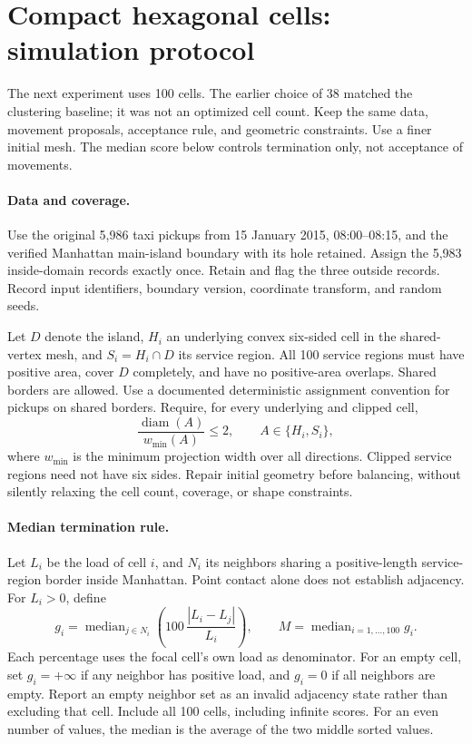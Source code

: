 \section{Compact hexagonal cells: simulation protocol}
\label{sec:compact-hexagon-protocol}

The next experiment uses 100 cells. The earlier choice of 38 matched
the clustering baseline; it was not an optimized cell count.
Keep the same data, movement proposals, acceptance rule, and geometric
constraints. Use a finer initial mesh. The median score below controls
termination only, not acceptance of movements.

\paragraph{Data and coverage.}
Use the original 5,986 taxi pickups from 15 January 2015,
08:00--08:15, and the verified Manhattan main-island boundary with
its hole retained. Assign the 5,983 inside-domain records exactly once.
Retain and flag the three outside records. Record input identifiers,
boundary version, coordinate transform, and random seeds.

Let $D$ denote the island, $H_i$ an underlying convex six-sided cell
in the shared-vertex mesh, and $S_i=H_i\cap D$ its service region.
All 100 service regions must have positive area, cover $D$ completely,
and have no positive-area overlaps. Shared borders are allowed.
Use a documented deterministic assignment convention for pickups on
shared borders. Require, for every underlying and clipped cell,
\[
 \frac{\operatorname{diam}(A)}{w_{\min}(A)}\leq 2,
 \qquad A\in\{H_i,S_i\},
\]
where $w_{\min}$ is the minimum projection width over all directions.
Clipped service regions need not have six sides.
Repair initial geometry before balancing, without silently relaxing
the cell count, coverage, or shape constraints.

\paragraph{Median termination rule.}
Let $L_i$ be the load of cell $i$, and $N_i$ its neighbors sharing a
positive-length service-region border inside Manhattan. Point contact
alone does not establish adjacency. For $L_i>0$, define
\[
 g_i=\operatorname{median}_{j\in N_i}
       \left(100\,\frac{|L_i-L_j|}{L_i}\right),
 \qquad
 M=\operatorname{median}_{i=1,\ldots,100} g_i.
\]
Each percentage uses the focal cell's own load as denominator.
For an empty cell, set $g_i=+\infty$ if any neighbor has positive
load, and $g_i=0$ if all neighbors are empty. Report an empty neighbor
set as an invalid adjacency state rather than excluding that cell.
Include all 100 cells, including infinite scores. For an even number
of values, the median is the average of the two middle sorted values.

